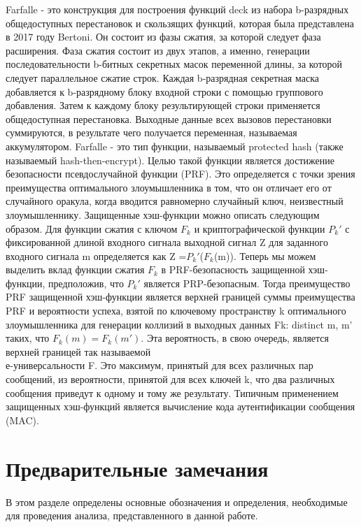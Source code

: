 \documentclass[utf8,14pt,a4paper,oneside,russian]{book}
\begin{document}
Farfalle - это конструкция для построения функций deck из набора 
b-разрядных общедоступных перестановок и скользящих функций, 
которая была представлена в 2017 году Bertoni. Он состоит из фазы сжатия, 
за которой следует фаза расширения. Фаза сжатия состоит из двух этапов, 
а именно, генерации последовательности b-битных секретных масок переменной 
длины, за которой следует параллельное сжатие строк. Каждая b-разрядная 
секретная маска добавляется к b-разрядному блоку входной строки с помощью 
группового добавления. Затем к каждому блоку результирующей строки применяется 
общедоступная перестановка. Выходные данные всех вызовов перестановки 
суммируются, в результате чего получается переменная, называемая аккумулятором.
Farfalle - это тип функции, называемый protected hash (также называемый 
hash-then-encrypt). Целью такой функции является достижение безопасности 
псевдослучайной функции (PRF). Это определяется с точки зрения преимущества 
оптимального злоумышленника в том, что он отличает его от случайного оракула, 
когда вводится равномерно случайный ключ, неизвестный злоумышленнику. 
Защищенные хэш-функции можно описать следующим образом. 
Для функции сжатия с ключом \(F_k\) и криптографической функции \(P_k'\) 
с фиксированной длиной входного сигнала выходной сигнал Z для заданного 
входного сигнала m определяется как Z =\(P_k'\)(\(F_k\)(m)).
Теперь мы можем выделить вклад функции сжатия \(F_k\) в PRF-безопасность 
защищенной хэш-функции, предположив, что \(P_k'\) является PRP-безопасным. 
Тогда преимущество PRF защищенной хэш-функции является верхней границей 
суммы преимущества PRF и вероятности успеха, взятой по ключевому 
пространству k оптимального злоумышленника для генерации коллизий в 
выходных данных Fk: distinct m, m' таких, что \(F_k(m) = F_k(m')\).
Эта вероятность, в свою очередь, является верхней границей так называемой\\
е-универсальности F. Это максимум, принятый для всех различных пар сообщений, 
из вероятности, принятой для всех ключей k, что два различных сообщения 
приведут к одному и тому же результату. Типичным применением защищенных 
хэш-функций является вычисление кода аутентификации сообщения (MAC).


\newpage
\section{Предварительные замечания}

В этом разделе определены основные обозначения и определения, необходимые 
для проведения анализа, представленного в данной работе.
\end{document}
